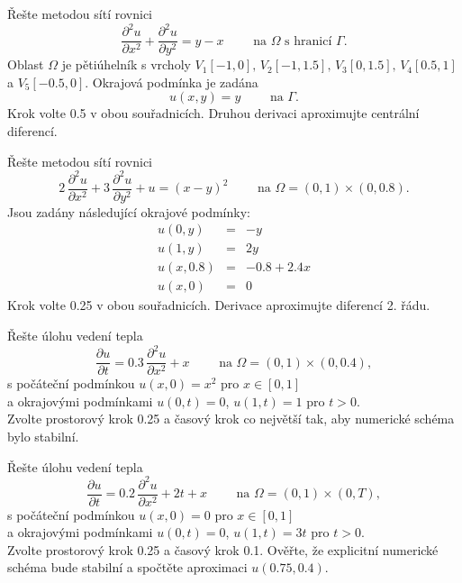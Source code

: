 \documentclass[a4paper,10pt]{book}
\begin{document}
\exercise \label{ex:pde1} Řešte metodou sítí rovnici 
\begin{equation*}
\frac{\partial^2 u}{\partial x^2} + \frac{\partial^2 u}{\partial y^2} = y-x \qquad \textrm{ na } \Omega \textrm{ s hranicí } \Gamma.
\end{equation*}
Oblast $\Omega$ je pětiúhelník s vrcholy $V_1[-1,0],\,V_2[-1,1.5],\,V_3[0,1.5],\,V_4[0.5,1]$ a $V_5[-0.5,0]$. Okrajová podmínka je zadána
\begin{equation*}
u(x,y) = y \qquad \textrm{ na } \Gamma.
\end{equation*}
Krok volte 0.5 v obou souřadnicích. Druhou derivaci aproximujte centrální diferencí.


\exercise \label{ex:pde2} Řešte metodou sítí rovnici 
\begin{equation*}
2\,\frac{\partial^2 u}{\partial x^2} + 3\,\frac{\partial^2 u}{\partial y^2} + u = (x-y)^2 \qquad \textrm{ na } \Omega=(0,1)\times(0,0.8).
\end{equation*}
Jsou zadány následující okrajové podmínky:
\begin{eqnarray*}
u(0,y) &=& -y \\
u(1,y) &=& 2y \\
u(x,0.8) &=& -0.8 + 2.4x \\
u(x,0) &=& 0
\end{eqnarray*}
Krok volte 0.25 v obou souřadnicích. Derivace aproximujte diferencí 2. řádu.

\exercise \label{ex:pde3} Řešte úlohu vedení tepla
\begin{equation*}
\frac{\partial u}{\partial t} = 0.3\,\frac{\partial^2 u}{\partial x^2} +x \qquad \textrm{ na } \Omega=(0,1)\times(0,0.4),
\end{equation*}
s počáteční podmínkou $u(x,0) = x^2$ pro $x\in [0,1]$ \\
a okrajovými podmínkami $u(0,t) = 0$, $u(1,t)=1$ pro $t>0$. \\
Zvolte prostorový krok 0.25 a časový krok co největší tak, aby numerické schéma bylo stabilní.

\exercise \label{ex:pde4} Řešte úlohu vedení tepla
\begin{equation*}
\frac{\partial u}{\partial t} = 0.2\,\frac{\partial^2 u}{\partial x^2} + 2t +x \qquad \textrm{ na } \Omega=(0,1)\times(0,T),
\end{equation*}
s počáteční podmínkou $u(x,0) = 0$ pro $x\in [0,1]$ \\
a okrajovými podmínkami $u(0,t) = 0$, $u(1,t)=3t$ pro $t>0$. \\
Zvolte prostorový krok 0.25 a časový krok 0.1. Ověřte, že explicitní numerické schéma bude stabilní a spočtěte aproximaci $u(0.75,0.4)$.
\end{document}
